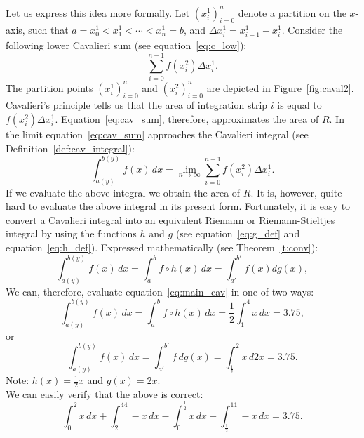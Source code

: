 \documentclass[twoside,reqno,11pt]{fcaa-var} %
\begin{document}
\noindent
Let us express this idea more formally. Let $(x_i^1)_{i=0}^{n}$ denote a partition on the $x$-axis, such that $a = x_0^1 < x_1^1 < \cdots < x_n^1 = b$, and $\Delta x_i^1 = x_{i+1}^1 - x_i^1$. Consider the following lower Cavalieri sum (see equation~\ref{eq:c_low}):
\begin{equation}
\label{eq:cav_sum}
\sum_{i=0}^{n-1} f(x_i^2)\Delta x_i^1.
\end{equation}
The partition points $(x_i^1)_{i=0}^{n}$ and $(x_i^2)_{i=0}^{n}$ are depicted in Figure~\ref{fig:caval2}. Cavalieri's principle tells us that the area of integration strip $i$ is equal to $f(x_i^2)\Delta x_i^1$. Equation~\eqref{eq:cav_sum}, therefore, approximates the area of $R$. In the limit equation~\eqref{eq:cav_sum} approaches 
the Cavalieri integral (see Definition~\ref{def:cav_integral}):
\begin{equation}
\label{eq:caval1}
\int_{a(y)}^{b(y)}f(x)\, dx = \lim_{n\to \infty}\sum_{i=0}^{n-1} f(x_i^2)\Delta x_i^1.
\end{equation}
If we evaluate the above integral we obtain the area of $R$. It is, however, quite hard to evaluate the above integral in its present form. Fortunately, it is easy to convert a Cavalieri integral into an equivalent Riemann or Riemann-Stieltjes 
integral by using the functions $h$ and $g$ (see equation~\eqref{eq:g_def} and equation~\eqref{eq:h_def}). Expressed mathematically (see Theorem~\ref{t:conv}):
\begin{equation}
\label{eq:main_cav}
\int_{a(y)}^{b(y)}f(x)\,dx =\int_a^b f \circ h (x)\, dx = \int_{a'}^{b'} f(x) dg(x),
\end{equation}
We can, therefore, evaluate equation~\eqref{eq:main_cav} in one of two ways:
\begin{equation}
\int_{a(y)}^{b(y)}f(x)\, dx = \int_a^b f \circ h (x)\, dx = \dfrac{1}{2}\int_1^4x\, dx = 3.75,  
\end{equation}
or
\begin{equation}
\int_{a(y)}^{b(y)}f(x)\, dx = \int_{a'}^{b'} f \, dg(x) = \int_{\frac{1}{2}}^2x\, d2x = 3.75.  
\end{equation}
Note: $h(x) = \frac{1}{2}x$ and $g(x) = 2x$.\\ 

\noindent
We can easily verify that the above is correct:
\begin{equation}
\int_0^2x\, dx+\int_2^44-x\, dx- \int_0^{\frac{1}{2}}x\, dx-\int_{\frac{1}{2}}^11-x\, dx = 3.75. 
\end{equation}
\end{document}
